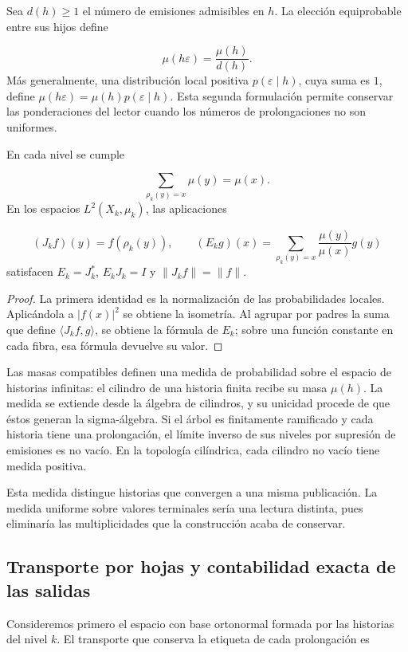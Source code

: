 Sea \(d(h)\geq1\) el número de emisiones admisibles en \(h\). La elección equiprobable entre sus hijos define

\[
\mu(h\varepsilon)=\frac{\mu(h)}{d(h)}.
\]
Más generalmente, una distribución local positiva \(p(\varepsilon\mid h)\), cuya suma es \(1\), define \(\mu(h\varepsilon)=\mu(h)p(\varepsilon\mid h)\). Esta segunda formulación permite conservar las ponderaciones del lector cuando los números de prolongaciones no son uniformes.

\begin{proposition}
\label{iv:cont:esperanza}
En cada nivel se cumple

\[
\sum_{\rho_k(y)=x}\mu(y)=\mu(x).
\]
En los espacios \(L^2(X_k,\mu_k)\), las aplicaciones

\[
(J_kf)(y)=f(\rho_k(y)),
\qquad
(E_kg)(x)=\sum_{\rho_k(y)=x}\frac{\mu(y)}{\mu(x)}g(y)
\]
satisfacen \(E_k=J_k^*\), \(E_kJ_k=I\) y \(\|J_kf\|=\|f\|\).

\end{proposition}
\begin{proof}
La primera identidad es la normalización de las probabilidades locales. Aplicándola a \(|f(x)|^2\) se obtiene la isometría. Al agrupar por padres la suma que define \(\langle J_kf,g\rangle\), se obtiene la fórmula de \(E_k\); sobre una función constante en cada fibra, esa fórmula devuelve su valor.
\end{proof}

Las masas compatibles definen una medida de probabilidad sobre el espacio de historias infinitas: el cilindro de una historia finita recibe su masa \(\mu(h)\). La medida se extiende desde la álgebra de cilindros, y su unicidad procede de que éstos generan la sigma-álgebra. Si el árbol es finitamente ramificado y cada historia tiene una prolongación, el límite inverso de sus niveles por supresión de emisiones es no vacío. En la topología cilíndrica, cada cilindro no vacío tiene medida positiva.

Esta medida distingue historias que convergen a una misma publicación. La medida uniforme sobre valores terminales sería una lectura distinta, pues eliminaría las multiplicidades que la construcción acaba de conservar.

\subsection{Transporte por hojas y contabilidad exacta de las salidas}
\label{iv:cont:transporte}
Consideremos primero el espacio con base ortonormal formada por las historias del nivel \(k\). El transporte que conserva la etiqueta de cada prolongación es

